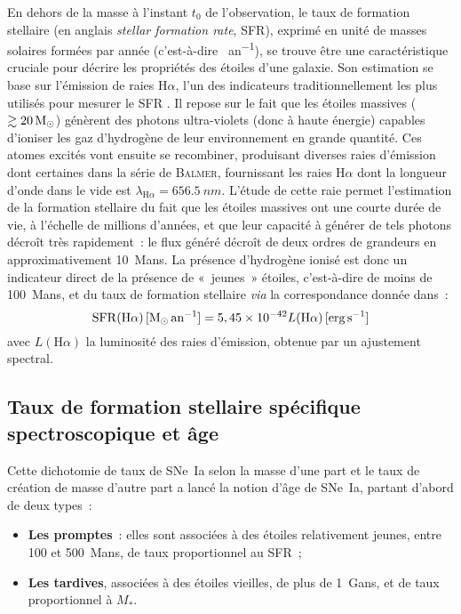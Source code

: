 \documentclass[../main/main.tex]{subfiles}
\begin{document}
En dehors de la masse à l'instant $t_0$ de l'observation, le taux de formation
stellaire (en anglais \textit{stellar formation rate}, SFR), exprimé en unité de
masses solaires formées par année (c'est-à-dire \si{\Msun.an^{-1}}), se trouve
être une caractéristique cruciale pour décrire les propriétés des étoiles d'une
galaxie. Son estimation se base sur l'émission de raies H$\alpha$, l'un des
indicateurs traditionnellement les plus utilisés pour mesurer le SFR
\citep{kennicutt1998}. Il repose sur le fait que les étoiles massives ($\gtrsim
\SI{20}{\Msun}$) génèrent des photons ultra-violets (donc à haute énergie)
capables d'ioniser les gaz d'hydrogène de leur environnement
\citep{calzetti2013} en grande quantité. Ces atomes excités vont ensuite se
recombiner, produisant diverses raies d'émission dont certaines dans la série de
\textsc{Balmer}, fournissant les raies H$\alpha$ dont la longueur d'onde dans le
vide est $\lambda_{\mathrm{H}\alpha} = \SI{656.5}{nm}$. L'étude de cette raie
permet l'estimation de la formation stellaire du fait que les étoiles massives
ont une courte durée de vie, à l'échelle de millions d'années, et que leur
capacité à générer de tels photons décroît très rapidement~: le flux généré
décroît de deux ordres de grandeurs en approximativement \SI{10}{Mans}. La
présence d'hydrogène ionisé est donc un indicateur direct de la présence de
«~jeunes~» étoiles, c'est-à-dire de moins de \SI{100}{Mans}, et du taux de
formation stellaire \textit{via} la correspondance donnée
dans~\cite{calzetti2013}:
\begin{equation}\label{eq:sfrha}
    \mathrm{SFR}(\mathrm{H}\alpha)\,[\si{\Msun.an^{-1}}] =
    5,45\times 10^{-42}L(\mathrm{H}\a)\,[\si{erg.s^{-1}}]
\end{equation}
avec $L(\mathrm{H}\alpha)$ la luminosité des raies d'émission, obtenue par un
ajustement spectral.

\subsection{Taux de formation stellaire spécifique
spectroscopique et âge}\label{ssec:lssfr}

Cette dichotomie de taux de SNe~Ia selon la masse d'une part et le taux de création de
masse d'autre part a lancé la notion d'âge de SNe~Ia, partant d'abord de deux
types~:
\begin{itemize}
    \item \textbf{Les promptes}~: elles sont associées à des étoiles
        relativement jeunes, entre \num{100} et \SI{500}{Mans}, de taux
        proportionnel au SFR~;
    \item \textbf{Les tardives}, associées à des étoiles vieilles, de plus de
        \SI{1}{Gans}, et de taux proportionnel à $M_*$.
\end{itemize}
\end{document}

